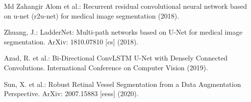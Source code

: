 \documentclass{svproc}
\begin{document}
\begin{thebibliography}{6}
Md Zahangir Alom et al.: Recurrent residual convolutional neural network based on u-net (r2u-net) for medical image segmentation (2018).

Zhuang, J.: LadderNet: Multi-path networks based on U-Net for medical image segmentation. ArXiv: 1810.07810 [cs] (2018).

Azad, R. et al.: Bi-Directional ConvLSTM U-Net with Densely Connected Convolutions. International Conference on Computer Vision (2019).

Sun, X. et al.: Robust Retinal Vessel Segmentation from a Data Augmentation Perspective. ArXiv: 2007.15883 [eess] (2020).



\end{thebibliography}
\end{document}
